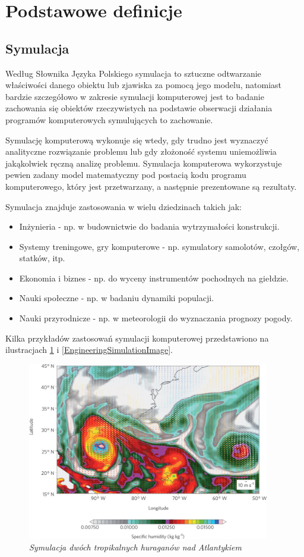 \documentclass[12pt, oneside]{report}
\theoremstyle{definition}
\begin{document}
\section{Podstawowe definicje}
\subsection{Symulacja}
Według Słownika Języka Polskiego \cite{PWNSymulacja} symulacja to sztuczne odtwarzanie właściwości danego obiektu lub zjawiska za pomocą jego modelu, natomiast bardzie szczegółowo w zakresie symulacji komputerowej jest to badanie zachowania się obiektów rzeczywistych na podstawie obserwacji działania programów komputerowych symulujących to zachowanie.


Symulację komputerową wykonuje się wtedy, gdy trudno jest wyznaczyć analityczne rozwiązanie problemu lub gdy złożoność systemu uniemożliwia jakąkolwiek ręczną analizę problemu. Symulacja komputerowa wykorzystuje pewien zadany model matematyczny pod postacią kodu programu komputerowego, który jest przetwarzany, a następnie prezentowane są rezultaty.

Symulacja znajduje zastosowania w wielu dziedzinach takich jak:
\begin{itemize}
\item Inżynieria - np. w budownictwie do badania wytrzymałości konstrukcji.
\item Systemy treningowe, gry komputerowe - np. symulatory samolotów, czołgów, statków, itp.
\item Ekonomia i biznes - np. do wyceny instrumentów pochodnych na giełdzie. 
\item Nauki społeczne - np. w badaniu dynamiki populacji.
\item Nauki przyrodnicze - np. w meteorologii do wyznaczania prognozy pogody.
\end{itemize}

\newpage
Kilka przykładów zastosowań symulacji komputerowej przedstawiono na ilustracjach \ref{MeteorologySimulationImage} i \ref{EngineeringSimulationImage}.

\begin{figure}[H]
	\centering
		\includegraphics[width = 300pt]{MeteorologySimulation} 
		\caption{\textit{Symulacja dwóch tropikalnych huraganów nad Atlantykiem \cite{MeteorologySimulation}}}
\label{MeteorologySimulationImage}
\end{figure}
\end{document}

